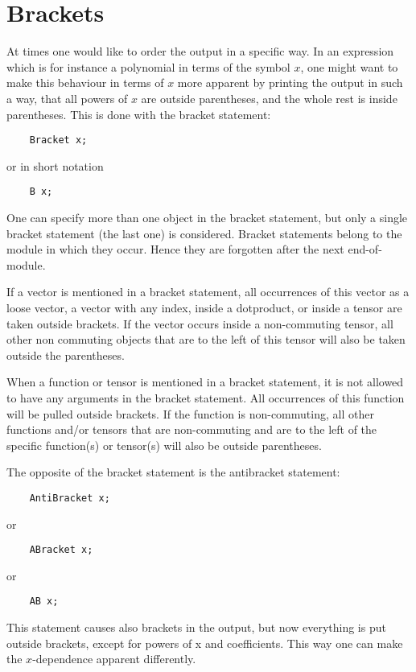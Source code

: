 \chapter{Brackets}
\label{brackets}

At times one would like to order the output in a specific way. In an 
expression which is for instance a polynomial in terms of the symbol $x$, 
one might want to make this behaviour in terms of $x$ more apparent by 
printing the output in such a way, that all powers of $x$ are outside 
parentheses, and the whole rest is inside parentheses. 
This is done with the bracket statement:
\begin{verbatim}
    Bracket x;
\end{verbatim}
or in short notation
\begin{verbatim}
    B x;
\end{verbatim}
One can specify more than one object in the bracket statement, but only a 
single bracket statement (the last one) is considered. Bracket statements 
belong to the module in which they occur. Hence they are forgotten after 
the next end-of-module.

If a vector is mentioned in a bracket statement, 
all occurrences of this vector as a loose vector, a vector with any index, 
inside a dotproduct, or inside a tensor are taken outside brackets. If the 
vector occurs inside a non-commuting tensor, all other non commuting 
objects that are to the left of this tensor will also be taken outside the 
parentheses.

When a function or tensor is mentioned in a bracket statement, it is not 
allowed to have any arguments in the bracket statement. All occurrences of 
this function will be pulled outside brackets. If the function is 
non-commuting, all other functions and/or tensors that are non-commuting 
and are to the left of the specific function(s) or tensor(s) will also be 
outside parentheses.

The opposite of the bracket statement is the antibracket 
statement:
\begin{verbatim}
    AntiBracket x;
\end{verbatim}
or
\begin{verbatim}
    ABracket x;
\end{verbatim}
or
\begin{verbatim}
    AB x;
\end{verbatim}
This statement causes also brackets in the output, but now everything is 
put outside brackets, except for powers of x and coefficients. This way one 
can make the $x$-dependence apparent differently.

